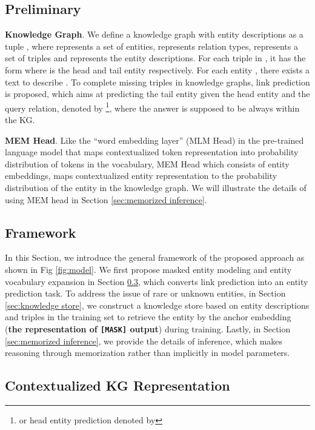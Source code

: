 \documentclass[runningheads]{llncs}
\begin{document}
\subsection{Preliminary}

\textbf{Knowledge Graph}.
We define a knowledge graph with entity descriptions as a tuple , where  represents a set of entities,  represents relation types,  represents a set of triples and  represents the entity descriptions. 
For each triple in , it has the form  where  is the head and tail entity respectively. For each entity , there exists a text  to describe .
To complete missing triples in knowledge graphs, link prediction is proposed, which aims at predicting the tail entity given the head entity and the query relation, denoted by \footnote{or head entity prediction denoted by },  where the answer is supposed to be always within the KG.



\textbf{MEM Head}.
Like the ``word embedding layer'' (MLM Head) in the pre-trained language model that maps contextualized token representation into probability distribution of tokens in the vocabulary, MEM Head which consists of entity embeddings, maps contextualized entity representation to the probability distribution of the entity in the knowledge graph.
We will illustrate the details of using MEM head in Section \ref{sec:memorized inference}.


\subsection{Framework}

In this Section, we introduce the general framework of the proposed approach as shown in Fig \ref{fig:model}. 
We first propose masked entity modeling and entity vocabulary expansion in Section \ref{sec:contextualized kg representation}, which converts link prediction into an entity prediction task.
To address the issue of rare or unknown entities,  in Section \ref{sec:knowledge store}, we construct a knowledge store based on entity descriptions and triples in the training set to retrieve the entity by the anchor embedding (\textbf{the representation of \texttt{[MASK]} output}) during training.
Lastly, in Section \ref{sec:memorized inference}, we provide the details of inference, which makes reasoning through memorization rather than implicitly in model parameters.

\subsection{Contextualized KG Representation}
\label{sec:contextualized kg representation}
\end{document}
